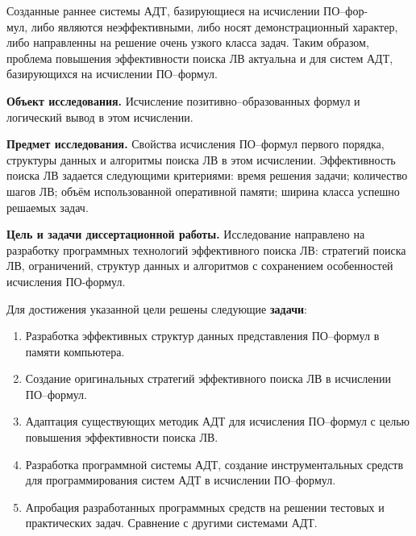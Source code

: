 \documentclass[a4paper]{report}
\begin{document}
Созданные раннее системы АДТ, базирующиеся на исчислении ПО--фор-\\мул, либо являются неэффективными, либо носят демонстрационный характер, либо направленны на решение очень узкого класса задач. Таким образом, проблема повышения эффективности поиска ЛВ актуальна и для систем АДТ, базирующихся на исчислении ПО--формул.

\textbf{Объект исследования.}
Исчисление позитивно--образованных формул и логический вывод в этом исчислении.

\textbf{Предмет исследования.}
Свойства исчисления ПО--формул первого порядка, структуры данных и алгоритмы поиска ЛВ в этом исчислении. Эффективность поиска ЛВ задается следующими критериями: время решения задачи; количество шагов ЛВ; объём использованной оперативной памяти; ширина класса успешно решаемых задач.

\textbf{Цель и задачи диссертационной работы.}
Исследование направлено на разработку программных технологий эффективного поиска ЛВ: стратегий поиска ЛВ, ограничений, структур данных и алгоритмов с сохранением особенностей исчисления ПО-формул.


Для достижения указанной цели решены следующие \textbf{задачи}:
\begin{enumerate}
\item Разработка эффективных структур данных представления ПО--формул в памяти компьютера.
\item Создание оригинальных стратегий эффективного поиска ЛВ в исчислении ПО--формул.
\item Адаптация существующих методик АДТ для исчисления ПО--формул с целью повышения эффективности поиска ЛВ.
\item Разработка программной системы АДТ, создание инструментальных средств для программирования систем АДТ в исчислении ПО--формул.
\item Апробация разработанных программных средств на решении тестовых и практических задач. Сравнение с другими системами АДТ.
\end{enumerate}
\end{document}

